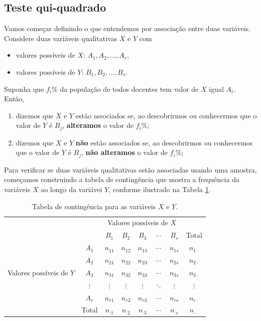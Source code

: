 \documentclass[]{article}
\providecommand{\tightlist}{%
  \setlength{\itemsep}{0pt}\setlength{\parskip}{0pt}}
\begin{document}
\hypertarget{teste-qui-quadrado}{%
\subsection{Teste qui-quadrado}\label{teste-qui-quadrado}}

Vamos começar definindo o que entendemos por associação entre duas variáveis.
Considere duas variáveis qualitativas \(X\) e \(Y\) com

\begin{itemize}
\tightlist
\item
  valores possíveis de \(X\): \(A_1, A_2, \dots, A_r\),
\item
  valores possíveis de \(Y\): \(B_1, B_2, \dots, B_s\).
\end{itemize}

Suponha que \(f_i \%\) da população de todos docentes tem valor de \(X\) igual \(A_i\).
Então,

\begin{enumerate}
\def\labelenumi{\arabic{enumi}.}
\tightlist
\item
  dizemos que \(X\) e \(Y\) estão associados se, ao descobrirmos ou conhecermos que o valor de
  \(Y\) é \(B_j\), \textbf{alteramos} o valor de \(f_i \%\);
\item
  dizemos que \(X\) e \(Y\) \textbf{não} estão associados se, ao descobrirmos ou conhecermos que o valor de
  \(Y\) é \(B_j\), \textbf{não alteramos} o valor de \(f_i \%\);
\end{enumerate}

Para verificar se duas variáveis qualitativas estão associadas usando uma amostra,
começamos construindo a tabela de contingência que mostra a frequência da variáveis
\(X\) ao longo da variávei \(Y\), conforme ilustrado na Tabela \ref{tab:contingencia}.

\begin{table}[htbp]
  \centering
  \caption{Tabela de contingência para as variáveis $X$ e $Y$.}
  \label{tab:contingencia}
  \begin{tabular}{c|c|ccccc|c}
    &  & \multicolumn{5}{|c|}{Valores possíveis de $X$} & \\ \cline{3-7}
    &  & $B_1$ & $B_2$ & $B_3$ & $\cdots$ & $B_s$ & Total\\ \hline
  \multirow{5}{*}{Valores possíveis de $Y$}  & $A_1$ & $n_{11}$ & $n_{12}$ & $n_{13}$ & $\cdots$ & $n_{1s}$ & $n_{1\cdot}$ \\
    & $A_2$ & $n_{21}$ & $n_{22}$ & $n_{23}$ & $\cdots$ & $n_{2s}$ & $n_{2\cdot}$ \\
    & $A_3$ & $n_{31}$ & $n_{32}$ & $n_{33}$ & $\cdots$ & $n_{3s}$ & $n_{3\cdot}$ \\
    & $\vdots$ & $\vdots$ & $\vdots$ & $\vdots$ & $\ddots$ & $\vdots$ & $\vdots$\\
    & $A_r$ & $n_{r1}$ & $n_{r2}$ & $n_{r3}$ & $\cdots$ & $n_{rs}$ & $n_{r\cdot}$  \\ \hline
    & Total & $n_{\cdot 1}$ & $n_{\cdot 2}$ & $n_{\cdot 3}$ & $\cdots$ & $n_{\cdot s}$ & $n_{\cdot \cdot}$ 
  \end{tabular}
\end{table}
\end{document}
